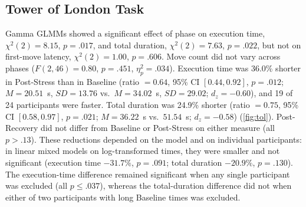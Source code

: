 \subsection{Tower of London Task}
Gamma GLMMs showed a significant effect of phase on execution time, $\chi^2(2)=8.15$, $p=.017$, and total duration, $\chi^2(2)=7.63$, $p=.022$, but not on first-move latency, $\chi^2(2)=1.00$, $p=.606$. Move count did not vary across phases ($F(2,46)=0.80$, $p=.451$, $\eta_p^2=.034$). Execution time was 36.0\% shorter in Post-Stress than in Baseline (ratio $=0.64$, 95\% CI $[0.44, 0.92]$, $p=.012$; $M=20.51$~s, $SD=13.76$ vs.\ $M=34.02$~s, $SD=29.02$; $d_z=-0.60$), and 19 of 24 participants were faster. Total duration was 24.9\% shorter (ratio $=0.75$, 95\% CI $[0.58, 0.97]$, $p=.021$; $M=36.22$~s vs.\ $51.54$~s; $d_z=-0.58$) (\autoref{fig:tol}). Post-Recovery did not differ from Baseline or Post-Stress on either measure (all $p > .13$). These reductions depended on the model and on individual participants: in linear mixed models on log-transformed times, they were smaller and not significant (execution time $-31.7\%$, $p=.091$; total duration $-20.9\%$, $p=.130$). The execution-time difference remained significant when any single participant was excluded (all $p \leq .037$), whereas the total-duration difference did not when either of two participants with long Baseline times was excluded.

